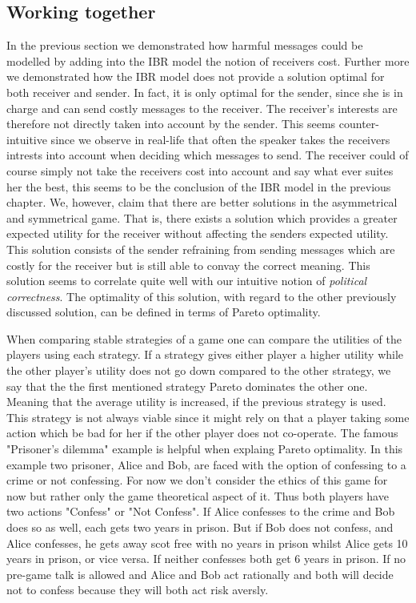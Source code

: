 \documentclass{article}
\begin{document}
\subsection{Working together}
In the previous section we demonstrated how harmful messages could be modelled by adding into the IBR model the notion of receivers cost. Further more we demonstrated how the IBR model does not provide a solution optimal for both receiver and sender. In fact, it is only optimal for the sender, since she is in charge and can send costly messages to the receiver. The receiver's interests are therefore not directly taken into account by the sender. This seems counter-intuitive since we observe in real-life that often the speaker takes the receivers intrests into account when deciding which messages to send. The receiver could of course simply not take the receivers cost into account and say what ever suites her the best, this seems to be the conclusion of the IBR model in the previous chapter. We, however, claim that there are better solutions in the asymmetrical and symmetrical game. That is, there exists a solution which provides a greater expected utility for the receiver without affecting the senders expected utility. This solution consists of the sender refraining from sending messages which are costly for the receiver but is still able to convay the correct meaning. This solution seems to correlate quite well with our intuitive notion of \textit{political correctness}. The optimality of this solution, with regard to the other previously discussed solution, can be defined in terms of Pareto optimality.

When comparing stable strategies of a game one can compare the utilities of the players using each strategy. If a strategy gives either player a higher utility while the other player's utility does not go down compared to the other strategy, we say that the the first mentioned strategy Pareto dominates the other one. Meaning that the average utility is increased, if the previous strategy is used. This strategy is not always viable since it might rely on that a player taking some action which be bad for her if the other player does not co-operate. The famous "Prisoner's dilemma" example is helpful when explaing Pareto optimality. In this example two prisoner, Alice and Bob, are faced with the option of confessing to a crime or not confessing. For now we don't consider the ethics of this game for now but rather only the game theoretical aspect of it. Thus both players have two actions "Confess" or "Not Confess". If Alice confesses to the crime and Bob does so as well, each gets two years in prison. But if Bob does not confess, and Alice confesses, he gets away scot free with no years in prison whilst Alice gets 10 years in prison, or vice versa. If neither confesses both get 6 years in prison. If no pre-game talk is allowed and Alice and Bob act rationally and both will decide not to confess because they will both act risk aversly.
\end{document}
